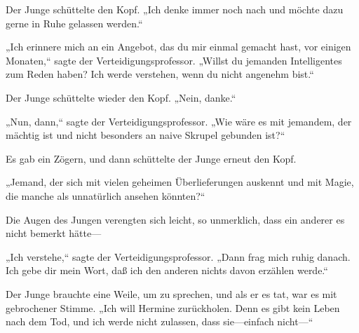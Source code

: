 Der Junge schüttelte den Kopf.
„Ich denke immer noch nach und möchte dazu gerne in Ruhe gelassen werden.“

„Ich erinnere mich an ein Angebot, das du mir einmal gemacht hast, vor einigen Monaten,“ sagte der Verteidigungsprofessor. „Willst du jemanden Intelligentes zum Reden haben? Ich werde verstehen, wenn du nicht angenehm bist.“

Der Junge schüttelte wieder den Kopf.
„Nein, danke.“

„Nun, dann,“ sagte der Verteidigungsprofessor. „Wie wäre es mit jemandem, der mächtig ist und nicht besonders an naive Skrupel gebunden ist?“

Es gab ein Zögern, und dann schüttelte der Junge erneut den Kopf.

„Jemand, der sich mit vielen geheimen Überlieferungen auskennt und mit Magie, die manche als unnatürlich ansehen könnten?“

Die Augen des Jungen verengten sich leicht, so unmerklich, dass ein anderer es nicht bemerkt hätte—

„Ich verstehe,“ sagte der Verteidigungsprofessor. „Dann frag mich ruhig danach. Ich gebe dir mein Wort, daß ich den anderen nichts davon erzählen werde.“


Der Junge brauchte eine Weile, um zu sprechen, und als er es tat, war es mit gebrochener Stimme. „Ich will Hermine zurückholen. Denn es gibt kein Leben nach dem Tod, und ich werde nicht zulassen, dass sie—einfach nicht—“

